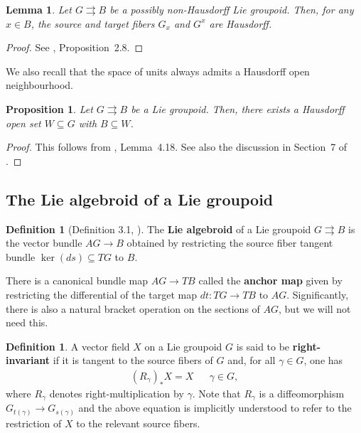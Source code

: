 \documentclass[12pt]{article}
\theoremstyle{plain}
\newtheorem{lemma}[thm]{Lemma}
\newtheorem{propn}[thm]{Proposition}
\theoremstyle{definition}
\newtheorem{defn}[thm]{Definition}
\numberwithin{equation}{section}
\begin{document}
\begin{lemma}\label{hausfib}
Let  $G \rightrightarrows B$ be a possibly non-Hausdorff Lie groupoid. Then, for any $x \in B$, the source and target fibers $G_x$ and $G^x$ are Hausdorff.
\end{lemma}
\begin{proof}
See \cite{Tu}, Proposition~2.8.
\end{proof}


We also recall that the space of units always admits a Hausdorff open neighbourhood.


\begin{propn}\label{hdrffnbhd}
Let $G \rightrightarrows B$ be a Lie groupoid. Then, there exists a Hausdorff open set $W \subseteq G$ with $B \subseteq W$.
\end{propn}
\begin{proof}
This follows from \cite{Crainic-Fernandes}, Lemma~4.18. See also the discussion in Section~7 of \cite{Loizides-Sadegh-Sanchez}.
\end{proof}




\subsection{The Lie algebroid of a Lie groupoid}

\begin{defn}[Definition 3.1, \cite{Mackenzie}]
The  \textbf{Lie algebroid} of a Lie groupoid $G \rightrightarrows B$ is the vector bundle $AG \to B$ obtained by restricting the source fiber tangent bundle $\ker(ds) \subseteq TG$ to $B$.
\end{defn}

There is a canonical bundle map $AG \to TB$ called the \textbf{anchor map} given by restricting the differential of the target map $dt: TG \to TB$ to $AG$. Significantly, there is also a natural bracket operation on the sections of $AG$, but we will not need this.



\begin{defn}
A vector field $X$ on a Lie groupoid $G$ is said to be \textbf{right-invariant} if it is tangent to the source fibers of $G$ and, for all $\gamma \in G$, one has 
\begin{align*} 
(R_\gamma)_* X = X && \gamma \in G,
\end{align*}
where $R_\gamma$ denotes right-multiplication by $\gamma$. Note that $R_\gamma$ is a diffeomorphism  $G_{t(\gamma)} \to G_{s(\gamma)}$ and the above equation is implicitly  understood to refer to the restriction of $X$ to the relevant source fibers.
\end{defn}
\end{document}
